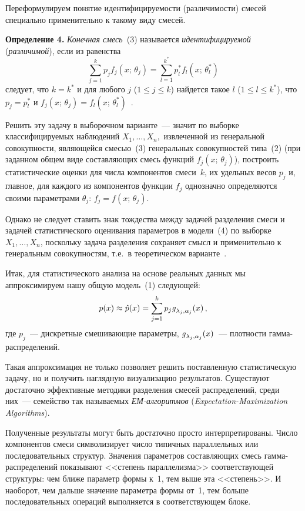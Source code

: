 \begin{multicols}{2}
Переформулируем понятие идентифицируемости (различимости) смесей
специально применительно к такому виду смесей.

\medskip
\textbf{Определение 4.} \textit{Конечная смесь}~(3) называется
\textit{идентифицируемой} (\textit{различимой}), если из равенства
$$
\sum\limits_{j=1}^k p_j f_j (x;\,\theta_j ) = \sum\limits_{l=1}^{k^*} p_l^* f_l
(x;\,\theta_l^* )
$$
следует, что $k=k^*$ и для любого $j$ ($1\leq j \leq k$) найдется такое $l$ 
($1\leq l \leq k^*$), что $p_j = p_l^*$ и $f_j (x;\,\theta_j ) = f_l 
(x;\,\theta_l^* )$~\cite{3bat}.

Решить эту задачу в выборочном варианте~--- значит по выборке
классифицируемых наблюдений
$X_1,\ldots , X_n, $ извлеченной из генеральной совокупности, яв\-ля\-ющей\-ся смесью~(3)
генеральных совокупностей типа~(2) (при заданном общем виде составляющих
смесь функций $f_j (x;\,\theta_j )$), построить статистические оценки для числа
компонентов смеси~$k$, их удельных весов $p_j$ и, главное, для каждого из
компонентов %
функции $f_j$ однозначно определяются своими параметрами $\theta_j$: $f_j
=f(x;\,\theta_j)$.

Однако не следует ставить знак тождества между задачей разделения смеси
и задачей статистического оценивания параметров в модели~(4) по выборке $
X_1,\ldots , X_n$, поскольку задача разделения сохраняет смысл и
применительно к генеральным совокупностям, т.е.\ в теоретическом
варианте~\cite{3bat}.

Итак, для статистического анализа на основе реальных данных мы
аппроксимируем нашу общую модель~(1) следующей:
$$
p(x) \approx \hat{p}(x) = \sum\limits_{j=1}^k p_j \mbox{\textit{g}}_{\lambda_j , \alpha_j}
(x)\,,
$$
где $p_j$~--- дискретные смешивающие параметры, $\mbox{\textit{g}}_{\lambda_j , \alpha_j}
(x)$~--- плотности гамма-распределений.

Такая аппроксимация не только позволяет решить поставленную статистическую
задачу, но и полу\-чить наглядную визуализацию результатов. Существуют
достаточно эффективные методики разделения смесей распределений, среди них~---
семейство так называемых \textit{ЕМ-алгоритмов}
(\textit{Expectation-Maximization Algorithms}).

Полученные результаты могут быть достаточно просто интерпретированы. Число
компонентов смеси символизирует число типичных параллельных или
последовательных структур. Значения параметров составляющих смесь
гам\-ма-рас\-пре\-де\-ле\-ний показывают <<степень параллелизма>>
соответствующей структуры: чем ближе параметр формы к~1, тем выше эта
<<степень>>. И наоборот, чем дальше значение параметра формы от~1, тем больше
последовательных операций выполняется в соответствующем блоке.


\end{multicols}
